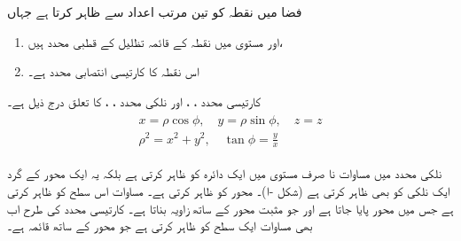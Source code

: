  فضا میں نقطہ  کو تین مرتب  اعداد    سے ظاہر کرتا ہے جہاں
\begin{enumerate}[1.]
\item
{} اور  مستوی  میں نقطہ  کے قائمہ تظلیل کے قطبی محدد ہیں،
\item
{} اس نقطہ کا کارتیسی انتصابی محدد ہے۔
\end{enumerate}

کارتیسی  محدد ، ،   اور نلکی محدد ، ،  کا تعلق درج  ذیل ہے۔
\begin{gather}
\begin{aligned}\label{مساوات_سمتیہ_نلکی_کارتیسی_تعلق}
x=\rho\cos\phi,\quad y=\rho\sin\phi,\quad z=z\\
\rho^2=x^2+y^2,\quad \tan\phi=\frac{y}{x}
\end{aligned}
\end{gather} 

نلکی محدد میں مساوات  نا صرف   مستوی میں  ایک دائرہ کو ظاہر کرتی ہے بلکہ یہ ایک  محور  کے گرد ایک نلکی کو بھی ظاہر کرتی ہے (شکل -ا)۔ محور  کو  ظاہر کرتی ہے۔ مساوات   اس سطح کو ظاہر کرتی ہے جس میں محور  پایا جاتا ہے اور جو مثبت محور  کے ساتھ زاویہ  بناتا ہے۔ کارتیسی محدد کی طرح اب بھی مساوات  ایک سطح کو ظاہر کرتی ہے جو محور  کے ساتھ  قائمہ ہے۔ 

